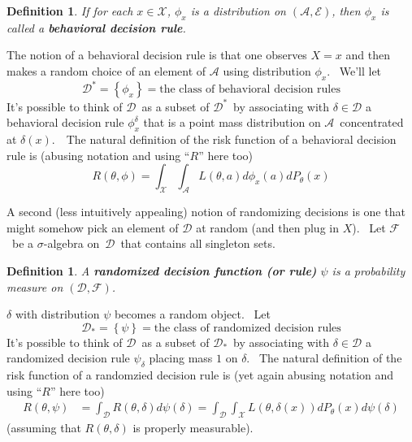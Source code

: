 \documentclass{article}
\newtheorem{definition}[theorem]{Definition}
\begin{document}
\begin{definition}
\label{behavioral}If for each $x\in\mathcal{X}$, $\phi_{x}$ is a distribution
on $\left(  \mathcal{A},\mathcal{E}\right)  $, then $\phi_{x}$ is called a
\textbf{behavioral decision rule}.
\end{definition}

The notion of a behavioral decision rule is that one observes $X=x$ and then
makes a random choice of an element of $\mathcal{A}$ using distribution
$\phi_{x}$. \ We'll let%
\[
\mathcal{D}^{\ast}=\left\{  \phi_{x}\right\}  =\text{the class of behavioral
decision rules}%
\]
It's possible to think of $\mathcal{D}$\ as a subset of $\mathcal{D}^{\ast}%
$\ by associating with $\delta\in\mathcal{D}$ a behavioral decision rule
$\phi_{x}^{\delta}$ that is a point mass distribution on $\mathcal{A}%
$\ concentrated at $\delta\left(  x\right)  $.\ \ The natural definition of
the risk function of a behavioral decision rule is (abusing notation and using
``$R$'' here too)%
\[
R\left(  \theta,\phi\right)  =\int_{\mathcal{X}}\int_{\mathcal{A}}L\left(
\theta,a\right)  d\phi_{x}\left(  a\right)  dP_{\theta}\left(  x\right)
\]


A second (less intuitively appealing) notion of randomizing decisions is one
that might somehow pick an element of $\mathcal{D}$ at random (and then plug
in $X$). \ Let $\mathcal{F}$\ be a $\sigma$-algebra on\ $\mathcal{D}$\ that
contains all singleton sets.

\begin{definition}
\label{randomized}A \textbf{randomized decision function (or rule)} $\psi$ is
a probability measure on $\left(  \mathcal{D},\mathcal{F}\right)  $.
\end{definition}

$\delta$ with distribution $\psi$ becomes a random object. \ Let%
\[
\mathcal{D}_{\ast}=\left\{  \psi\right\}  =\text{the class of randomized
decision rules}%
\]
It's possible to think of $\mathcal{D}$\ as a subset of $\mathcal{D}_{\ast}%
$\ by associating with $\delta\in\mathcal{D}$ a randomized decision rule
$\psi_{\delta}$ placing mass $1$ on $\delta$. \ The natural definition of the
risk function of a randomzied decision rule is (yet again abusing notation and
using ``$R$'' here too)%
\begin{align*}
R\left(  \theta,\psi\right)   &  =\int_{\mathcal{D}}R\left(  \theta
,\delta\right)  d\psi\left(  \delta\right)  =\int_{\mathcal{D}}\int_{\mathcal{X}}L\left(  \theta,\delta\left(
x\right)  \right)  dP_{\theta}\left(  x\right)  d\psi\left(  \delta\right)
\end{align*}
(assuming that $R\left(  \theta,\delta\right)  $ is properly measurable).
\end{document}
